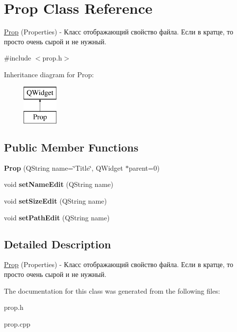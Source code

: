 \hypertarget{class_prop}{}\section{Prop Class Reference}
\label{class_prop}


\hyperlink{class_prop}{Prop} (Properties) -\/ Класс отображающий свойство файла. Если в кратце, то просто очень сырой и не нужный.  




{\ttfamily \#include $<$prop.\+h$>$}

Inheritance diagram for Prop\+:\begin{figure}[H]
\begin{center}
\leavevmode
\includegraphics[height=2.000000cm]{class_prop}
\end{center}
\end{figure}
\subsection*{Public Member Functions}
\begin{DoxyCompactItemize}
\item 
\mbox{\label{class_prop_a14a5bfb4b751a2d65516d4d7724f4cae}} 
{\bfseries Prop} (Q\+String name=\char`\"{}Title\char`\"{}, Q\+Widget $\ast$parent=0)
\item 
\mbox{\label{class_prop_a126f5332ae79e0b924f17c81e8529bcc}} 
void {\bfseries set\+Name\+Edit} (Q\+String name)
\item 
\mbox{\label{class_prop_af4b5a88ba0af1f317768e5695a3454d2}} 
void {\bfseries set\+Size\+Edit} (Q\+String name)
\item 
\mbox{\label{class_prop_a24b678764b43b8fd932631aec6e80011}} 
void {\bfseries set\+Path\+Edit} (Q\+String name)
\end{DoxyCompactItemize}


\subsection{Detailed Description}
\hyperlink{class_prop}{Prop} (Properties) -\/ Класс отображающий свойство файла. Если в кратце, то просто очень сырой и не нужный. 

The documentation for this class was generated from the following files\+:\begin{DoxyCompactItemize}
\item 
prop.\+h\item 
prop.\+cpp\end{DoxyCompactItemize}
